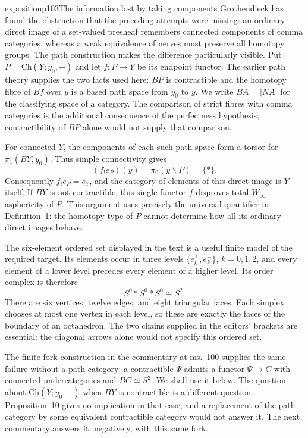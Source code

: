 \begin{dcomment}{exposition}{p103}{The information lost by taking components}
Grothendieck has found the obstruction that the preceding attempts were missing: an ordinary direct image of a set-valued presheaf remembers connected components of comma categories, whereas a weak equivalence of nerves must preserve all homotopy groups. The path construction makes the difference particularly visible. Put $P=\underline{\mathrm{Ch}}(Y;y_0,-)$ and let $f:P\to Y$ be its endpoint functor. The earlier path theory supplies the two facts used here: $BP$ is contractible and the homotopy fibre of $Bf$ over $y$ is a based path space from $y_0$ to $y$. We write $BA=|NA|$ for the classifying space of a category. The comparison of strict fibres with comma categories is the additional consequence of the perfectness hypothesis; contractibility of $BP$ alone would not supply that comparison.

For connected $Y$, the components of each such path space form a torsor for $\pi_1(BY,y_0)$. Thus simple connectivity gives
\[
 (f_!e_P)(y)=\pi_0(y\backslash P)=\{*\}.
\]
Consequently $f_!e_P=e_Y$, and the category of elements of this direct image is $Y$ itself. If $BY$ is not contractible, this single functor $f$ disproves total $W_\infty$-asphericity of $P$. This argument uses precisely the universal quantifier in Definition~1: the homotopy type of $P$ cannot determine how all its ordinary direct images behave.

The six-element ordered set displayed in the text is a useful finite model of the required target. Its elements occur in three levels $\{e_k^+,e_k^-\}$, $k=0,1,2$, and every element of a lower level precedes every element of a higher level. Its order complex is therefore
\[
 S^0*S^0*S^0\cong S^2.
\]
There are six vertices, twelve edges, and eight triangular faces. Each simplex chooses at most one vertex in each level, so these are exactly the faces of the boundary of an octahedron. The two chains supplied in the editors' brackets are essential: the diagonal arrows alone would not specify this ordered set.

The finite fork construction in the commentary at ms.~100 supplies the same failure without a path category: a contractible $\Psi$ admits a functor $\Psi\to C$ with connected undercategories and $BC\simeq S^2$. We shall use it below. The question about $\underline{\mathrm{Ch}}(Y;y_0,-)$ when $BY$ is contractible is a different question. Proposition~10 gives no implication in that case, and a replacement of the path category by some equivalent contractible category would not answer it. The next commentary answers it, negatively, with this same fork.
\end{dcomment}

